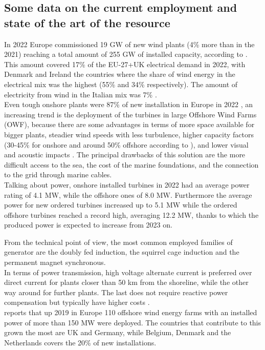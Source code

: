 \subsection{Some data on the current employment and state of the art of the resource}
In 2022 Europe commissioned 19 $\si{\giga\watt}$ of new wind plants (4\% more than in the 2021) reaching a total amount of 255 $\si{\giga\watt}$ of installed capacity, according to \cite{wind_europe_data_2022}. This amount covered 17\% of the EU-27+UK electrical demand in 2022, with Denmark and Ireland the countries where the share of wind energy in the electrical mix was the highest (55\% and 34\% respectively). The amount of electricity from wind in the Italian mix was 7\% \cite{wind_europe_data_2022}.\\
Even tough onshore plants were 87\% of new installation in Europe in 2022 \cite{wind_europe_data_2022}, an increasing trend is the deployment of the turbines in large Offshore Wind Farms (OWF), because there are some advantages in terms of more space available for bigger plants, steadier wind speeds with less turbulence, higher capacity factors (30-45\% for onshore and around 50\% offshore according to \cite{wind_europe_data_2022}), and lower visual and acoustic impacts \cite{current_staus_and_future_trends_of_offshore_wind_power_in_europe}. The principal drawbacks of this solution are the more difficult access to the sea, the cost of the marine foundations, and the connection to the grid through marine cables.  \\
Talking about power, onshore installed turbines in 2022 had an average power rating of 4.1 $\si{\mega\watt}$, while the offshore ones of 8.0 $\si{\mega\watt}$. Furthermore the average power for new ordered turbines increased up to 5.1 $\si{\mega\watt}$ while the ordered offshore turbines reached a record high, averaging 12.2 $\si{\mega\watt}$, thanks to which the produced power is expected to increase from 2023 on.

From the technical point of view, the most common employed families of generator are the doubly fed induction, the squirrel cage induction and the permanent magnet synchronous.\\
In terms of power transmission, high voltage alternate current is preferred over direct current for plants closer than 50 km from the shoreline, while the other way around for further plants. The last does not require reactive power compensation but typically have higher costs \cite{current_staus_and_future_trends_of_offshore_wind_power_in_europe}.\\
\cite{current_staus_and_future_trends_of_offshore_wind_power_in_europe} reports that up 2019 in Europe 110 offshore wind energy farms with an installed power of more than 150 $\si{\mega\watt}$ were deployed. The countries that contribute to this grown the most are UK and Germany, while Belgium, Denmark and the Netherlands covers the 20\% of new installations.


